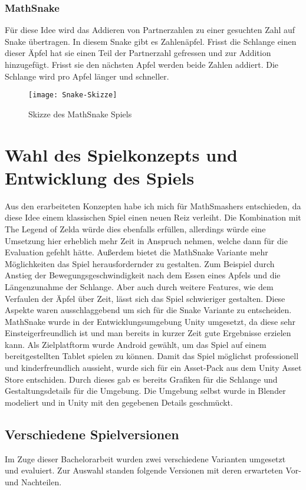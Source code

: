 \subsubsection{MathSnake}
Für diese Idee wird das Addieren von Partnerzahlen zu einer gesuchten Zahl auf Snake übertragen. In diesem Snake gibt es Zahlenäpfel. Frisst die Schlange einen dieser Äpfel hat sie einen Teil der Partnerzahl gefressen und zur Addition hinzugefügt. Frisst sie den nächsten Apfel werden beide Zahlen addiert. Die Schlange wird pro Apfel länger und schneller.
\begin{figure}[htb]
	\centering
	\texttt{[image: Snake-Skizze]}
	\caption{Skizze des MathSnake Spiels\label{fig:mathsnake}}
\end{figure}
\section{Wahl des Spielkonzepts und Entwicklung des Spiels}
Aus den erarbeiteten Konzepten habe ich mich für MathSmashers entschieden, da diese Idee einem klassischen Spiel einen neuen Reiz verleiht. Die Kombination mit The Legend of Zelda würde dies ebenfalls erfüllen, allerdings würde eine Umsetzung hier erheblich mehr Zeit in Anspruch nehmen, welche dann für die Evaluation gefehlt hätte. Außerdem bietet die MathSnake Variante mehr Möglichkeiten das Spiel herausfordernder zu gestalten. Zum Beispiel durch Anstieg der Bewegungsgeschwindigkeit nach dem Essen eines Apfels und die Längenzunahme der Schlange. Aber auch durch weitere Features, wie dem Verfaulen der Äpfel über Zeit, lässt sich das Spiel schwieriger gestalten. Diese Aspekte waren ausschlaggebend um sich für die Snake Variante zu entscheiden.
MathSnake wurde in der Entwicklungsumgebung Unity umgesetzt, da diese sehr Einsteigerfreundlich ist und man bereits in kurzer Zeit gute Ergebnisse erzielen kann. Als Zielplatftorm wurde Android gewählt, um das Spiel auf einem bereitgestellten Tablet spielen zu können. Damit das Spiel möglichst professionell und kinderfreundlich aussieht, wurde sich für ein Asset-Pack aus dem Unity Asset Store entschiden. Durch dieses gab es bereits Grafiken für die Schlange und Gestaltungsdetails für die Umgebung. Die Umgebung selbst wurde in Blender modeliert und in Unity mit den gegebenen Details geschmückt.
\subsection{Verschiedene Spielversionen}
Im Zuge dieser Bachelorarbeit wurden zwei verschiedene Varianten umgesetzt und evaluiert. Zur Auswahl standen folgende Versionen mit deren erwarteten Vor- und Nachteilen.

